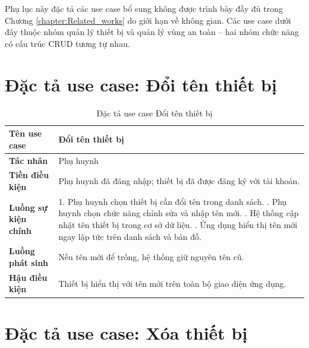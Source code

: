 \documentclass[../DoAn.tex]{subfiles}
\begin{document}
Phụ lục này đặc tả các use case bổ sung không được trình bày đầy đủ trong Chương \ref{chapter:Related_works} do giới hạn về không gian. Các use case dưới đây thuộc nhóm quản lý thiết bị và quản lý vùng an toàn -- hai nhóm chức năng có cấu trúc CRUD tương tự nhau.

\section{Đặc tả use case: Đổi tên thiết bị}

\begin{table}[H]
\centering
\caption{Đặc tả use case Đổi tên thiết bị}
\label{table:uc_rename_device}
\begin{tabular}{|l|p{9.5cm}|}
\hline
\textbf{Tên use case}       & Đổi tên thiết bị \\
\hline
\textbf{Tác nhân}           & Phụ huynh \\
\hline
\textbf{Tiền điều kiện}     & Phụ huynh đã đăng nhập; thiết bị đã được đăng ký với tài khoản. \\
\hline
\textbf{Luồng sự kiện chính} &
1. Phụ huynh chọn thiết bị cần đổi tên trong danh sách. \newline
2. Phụ huynh chọn chức năng chỉnh sửa và nhập tên mới. \newline
3. Hệ thống cập nhật tên thiết bị trong cơ sở dữ liệu. \newline
4. Ứng dụng hiển thị tên mới ngay lập tức trên danh sách và bản đồ. \\
\hline
\textbf{Luồng phát sinh}    & Nếu tên mới để trống, hệ thống giữ nguyên tên cũ. \\
\hline
\textbf{Hậu điều kiện}      & Thiết bị hiển thị với tên mới trên toàn bộ giao diện ứng dụng. \\
\hline
\end{tabular}
\end{table}

\section{Đặc tả use case: Xóa thiết bị}
\end{document}
